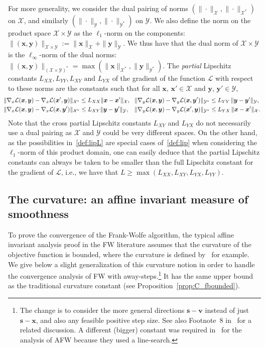 \documentclass[twoside]{article}
\renewcommand{\L}{\mathcal{L}}
\newcommand{\X}{\mathcal{X}}
\newcommand{\Y}{\mathcal{Y}}
\newcommand{\x}{\bm{x}}
\newcommand{\y}{\bm{y}}
\newcommand{\s}{\bm{s}}
\newcommand{\vv}{\bm{v}} %
\newcommand{\0}{\mathbf{0}} %
\begin{document}
     For more generality, we consider the dual pairing of norms $({\|\cdot\|_\X}, {\|\cdot\|_{\X^*}})$ on $\X$, and similarly $({\|\cdot\|_\Y}, {\|\cdot\|_{\Y^*}})$ on $\Y$. We also define the norm on the product space $\X \times \Y$ as the $\ell_1$-norm on the components: $\|(\x,\y)\|_{\X \times \Y} := \|\x\|_\X + \|\y\|_\Y$. We thus have that the dual norm of $\X \times \Y$ is the $\ell_\infty$-norm of the dual norms: $\|(\x,\y)\|_{(\X \times \Y)^*} = \max ( \|\x\|_{\X^*}, \|\y\|_{\Y^*})$.
     The \emph{partial} Lipschitz constants $L_{XX},L_{YY},L_{XY} \text{ and } L_{YX}$ of the gradient of the function $\L$ with respect to these norms are the constants such that for all $\x, \,\x' \in \X$ and $\y, \,\y' \in \Y$,
     \begin{equation}
     \label{def:lipL}
     \begin{aligned}
        \hspace{-3mm} \|\nabla_x \L (\x,\y) - \nabla_x \L(\x',\y) \|_{\X^*} &\leq L_{XX} \| \x - \x'\|_\X, &\! 
        \|\nabla_y \L (\x,\y) - \nabla_y \L(\x,\y') \|_{\Y^*} &\leq L_{YY}\,\| \y - \y'\|_\Y, \\
        \hspace{-3mm} \|\nabla_x \L (\x,\y) - \nabla_x \L(\x,\y') \|_{\X^*} &\leq L_{XY} \| \y - \y'\|_\Y,  
        &\!
        \|\nabla_y \L (\x,\y) - \nabla_y \L(\x',\y) \|_{\Y^*} &\leq L_{YX} \,\| \x - \x'\|_\X.
     \end{aligned}
     \end{equation}
  Note that the cross partial Lipschitz constants $L_{XY}$ and $L_{YX}$ do not necessarily use a dual pairing as $\X$ and $\Y$ could be very different spaces. 
  On the other hand, as the possibilities in~\eqref{def:lipL} are special cases of~\eqref{def:lip} when considering the $\ell_1$-norm of this product domain, one can easily deduce that the partial Lipschitz constants can always be taken to be smaller than the full Lipschitz constant for the gradient of $\L$, i.e., we have that $L \geq \max(L_{XX}, L_{XY}, L_{YX}, L_{YY})$.

    
    \subsection{The curvature: an affine invariant measure of smoothness} \label{sub:curv}
    
    To prove the convergence of the Frank-Wolfe algorithm, the typical affine invariant analysis proof in the FW literature assumes that the curvature of the objective function is bounded, where the curvature is defined by~\citet{jaggi2013revisiting} for example. 
    We give below a slight generalization of this curvature notion in order to handle the convergence analysis of FW with away-steps.\footnote{\label{foot:Cfcomment}The change is to consider the more general directions $\s - \vv$ instead of just $\s - \x$, and also any feasible positive step size. 
    See also Footnote~8 in~ for a related discussion. A different (bigger) constant was required in~\citep{lacoste2015global} for the analysis of AFW because they used a line-search.} 
    It has the same upper bound as the traditional curvature constant (see Proposition~\ref{prop:C_fbounded}).
\end{document}
